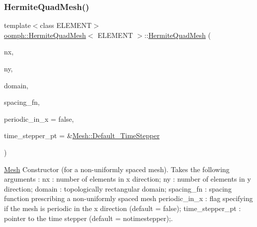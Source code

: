 \mbox{\label{classoomph_1_1HermiteQuadMesh_ae28d471336aebafc5fe5e9f303ab0ad8}} 
\subsubsection{\texorpdfstring{Hermite\+Quad\+Mesh()}{HermiteQuadMesh()}\hspace{0.1cm}{\footnotesize\ttfamily [2/2]}}
{\footnotesize\ttfamily template$<$class E\+L\+E\+M\+E\+NT$>$ \\
\hyperlink{classoomph_1_1HermiteQuadMesh}{oomph\+::\+Hermite\+Quad\+Mesh}$<$ E\+L\+E\+M\+E\+NT $>$\+::\hyperlink{classoomph_1_1HermiteQuadMesh}{Hermite\+Quad\+Mesh} (\begin{DoxyParamCaption}\item[{const unsigned \&}]{nx,  }\item[{const unsigned \&}]{ny,  }\item[{\hyperlink{classoomph_1_1TopologicallyRectangularDomain}{Topologically\+Rectangular\+Domain} $\ast$}]{domain,  }\item[{const \hyperlink{classoomph_1_1HermiteQuadMesh_abebf4806b300591f976398404ed0ef3f}{Mesh\+Spacing\+Fn\+Ptr}}]{spacing\+\_\+fn,  }\item[{const bool \&}]{periodic\+\_\+in\+\_\+x = {\ttfamily false},  }\item[{\hyperlink{classoomph_1_1TimeStepper}{Time\+Stepper} $\ast$}]{time\+\_\+stepper\+\_\+pt = {\ttfamily \&\hyperlink{classoomph_1_1Mesh_a12243d0fee2b1fcee729ee5a4777ea10}{Mesh\+::\+Default\+\_\+\+Time\+Stepper}} }\end{DoxyParamCaption})\hspace{0.3cm}{\ttfamily [inline]}}



\hyperlink{classoomph_1_1Mesh}{Mesh} Constructor (for a non-\/uniformly spaced mesh). Takes the following arguments \+: nx \+: number of elements in x direction; ny \+: number of elements in y direction; domain \+: topologically rectangular domain; spacing\+\_\+fn \+: spacing function prescribing a non-\/uniformly spaced mesh periodic\+\_\+in\+\_\+x \+: flag specifying if the mesh is periodic in the x direction (default = false); time\+\_\+stepper\+\_\+pt \+: pointer to the time stepper (default = notimestepper);. 


